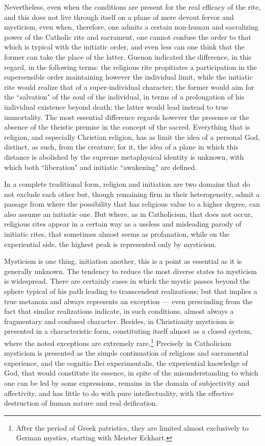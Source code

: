 Nevertheless, even when the conditions are present for the real efficacy of the rite, and this does not live through itself on a plane of mere devout fervor and mysticism, even when, therefore, one admits a certain non-human and sacralizing power of the Catholic rite and sacrament, one cannot confuse the order to that which is typical with the initiatic order, and even less can one think that the former can take the place of the latter. Guenon indicated the difference, in this regard, in the following terms: the religious rite propitiates a participation in the supersensible order maintaining however the individual limit, while the initiatic rite would realize that of a super-individual character; the former would aim for the ``salvation" of the soul of the individual, in terms of a prolongation of his individual existence beyond death; the latter would lead instead to true immortality. The most essential difference regards however the presence or the absence of the theistic premise in the concept of the sacred. Everything that is religion, and especially Christian religion, has as limit the idea of a personal God, distinct, as such, from the creature; for it, the idea of a plane in which this distance is abolished by the supreme metaphysical identity is unknown, with which both ``liberation" and initiatic ``awakening" are defined.

In a complete traditional form, religion and initiation are two domains that do not exclude each other but, though remaining firm in their heterogeneity, admit a passage from where the possibility that has religious value to a higher degree, can also assume an initiatic one. But where, as in Catholicism, that does not occur, religious rites appear in a certain way as a useless and misleading parody of initiatic rites, that sometimes almost seems as profanation, while on the experiential side, the highest peak is represented only by mysticism.

Mysticism is one thing, initiation another, this is a point as essential as it is generally unknown. The tendency to reduce the most diverse states to mysticism is widespread. There are certainly cases in which the mystic passes beyond the sphere typical of his path leading to transcendent realizations; but that implies a true metanoia and always represents an exception — even prescinding from the fact that similar realizations indicate, in such conditions, almost always a fragmentary and confused character. Besides, in Christianity mysticism is presented in a characteristic form, constituting itself almost as a closed system, where the noted exceptions are extremely rare.\footnote{After the period of Greek patristics, they are limited almost exclusively to German mystics, starting with Meister Eckhart.} Precisely in Catholicism mysticism is presented as the simple continuation of religious and sacramental experience, and the cognitio Dei experimentalis, the experiential knowledge of God, that would constitute its essence, in spite of the misunderstanding to which one can be led by some expressions, remains in the domain of subjectivity and affectivity, and has little to do with pure intellectuality, with the effective destruction of human nature and real deification.

